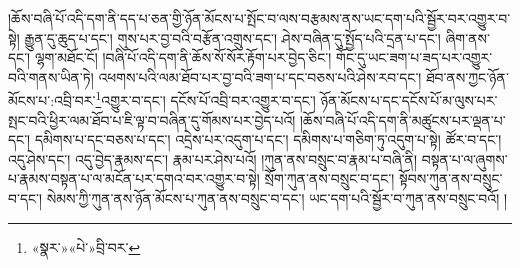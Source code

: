 །ཆོས་བཞི་པོ་འདི་དག་ནི་དད་པ་ཅན་གྱི་ཉོན་མོངས་པ་སྤོང་བ་ལས་བརྩམས་ནས་ཡང་དག་པའི་སྦྱོར་བར་འགྱུར་བ་སྟེ། རྒྱུན་དུ་ཆུད་པ་དང་། གུས་པར་བྱ་བའི་བརྩོན་འགྲུས་དང་། ཤེས་བཞིན་དུ་སྤྱོད་པའི་དྲན་པ་དང་། ཞིག་ནས་དང་། ལྷག་མཐོང་ངོ། །བཞི་པོ་འདི་དག་ནི་ཆོས་སོ་སོར་རྟོག་པར་བྱེད་ཅིང་། གོང་དུ་ཡང་ཟག་པ་ཟད་པར་འགྱུར་བའི་གནས་ཡིན་ཏེ། འཕགས་པའི་ལམ་ཐོབ་པར་བྱ་བའི་ཟག་པ་དང་བཅས་པའི་ཤེས་རབ་དང་། ཐོབ་ནས་ཀྱང་ཉོན་མོངས་པ་:འབྲི་བར་\footnote{«སྣར་»«པེ་»བྲི་བར་}འགྱུར་བ་དང་། དངོས་པོ་འབྲི་བར་འགྱུར་བ་དང་། ཉོན་མོངས་པ་དང་དངོས་པོ་མ་ལུས་པར་སྤང་བའི་ཕྱིར་ལམ་ཐོབ་པ་ཇི་ལྟ་བ་བཞིན་དུ་གོམས་པར་བྱེད་པའོ། །ཆོས་བཞི་པོ་འདི་དག་ནི་མཚུངས་པར་ལྡན་པ་དང་། དམིགས་པ་དང་བཅས་པ་དང་། འདྲེས་པར་འདུག་པ་དང་། དམིགས་པ་གཅིག་ཏུ་འདུག་པ་སྟེ། ཚོར་བ་དང་། འདུ་ཤེས་དང་། འདུ་བྱེད་རྣམས་དང་། རྣམ་པར་ཤེས་པའོ། །ཀུན་ནས་བསྲུང་བ་རྣམ་པ་བཞི་ནི། བསྟན་པ་ལ་ཞུགས་པ་རྣམས་བསྟན་པ་ལ་མངོན་པར་དགའ་བར་འགྱུར་བ་སྟེ། སྲོག་ཀུན་ནས་བསྲུང་བ་དང་། སྟོབས་ཀུན་ནས་བསྲུང་བ་དང་། སེམས་ཀྱི་ཀུན་ནས་ཉོན་མོངས་པ་ཀུན་ནས་བསྲུང་བ་དང་། ཡང་དག་པའི་སྦྱོར་བ་ཀུན་ནས་བསྲུང་བའོ། །
